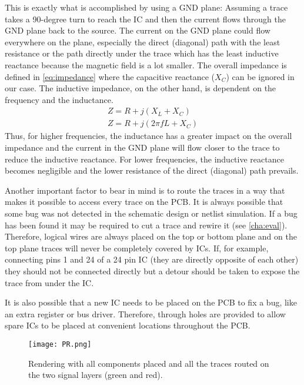This is exactly what is accomplished by using a GND plane:
Assuming a trace takes a 90-degree turn to reach the \gls{IC} and then the current flows through the GND plane back to the source.
The current on the GND plane could flow everywhere on the plane, especially the direct (diagonal) path with the least resistance or the path directly under the trace which has the least inductive reactance because the magnetic field is a lot smaller.
The overall impedance is defined in \cref{eq:impedance} where the capacitive reactance ($X_C$) can be ignored in our case.
The inductive impedance, on the other hand, is dependent on the frequency and the inductance. \cite[page 45]{Albach2011_2}
\begin{eqnarray}
  Z=R+j(X_L+X_C)\label{eq:impedance}\\
  Z=R+j(2\pi fL+X_C)
\end{eqnarray}
Thus, for higher frequencies, the inductance has a greater impact on the overall impedance and the current in the GND plane will flow closer to the trace to reduce the inductive reactance.
For lower frequencies, the inductive reactance becomes negligible and the lower resistance of the direct (diagonal) path prevails.

Another important factor to bear in mind is to route the traces in a way that makes it possible to access every trace on the \gls{PCB}.
It is always possible that some bug was not detected in the schematic design or netlist simulation.
If a bug has been found it may be required to cut a trace and rewire it (see \cref{cha:eval}).
Therefore, logical wires are always placed on the top or bottom plane and on the top plane traces will never be completely covered by \glspl{IC}.
If, for example, connecting pins 1 and 24 of a 24 pin \gls{IC} (they are directly opposite of each other) they should not be connected directly but a detour should be taken to expose the trace from under the \gls{IC}.

It is also possible that a new \gls{IC} needs to be placed on the \gls{PCB} to fix a bug, like an extra register or bus driver.
Therefore, through holes are provided to allow spare \glspl{IC} to be placed at convenient locations throughout the \gls{PCB}.

\begin{figure}[p]
  \centering
  \texttt{[image: PR.png]}
  \caption{Rendering with all components placed and all the traces routed on the two signal layers (green and red).}
  \label{fig:pr}
\end{figure}
